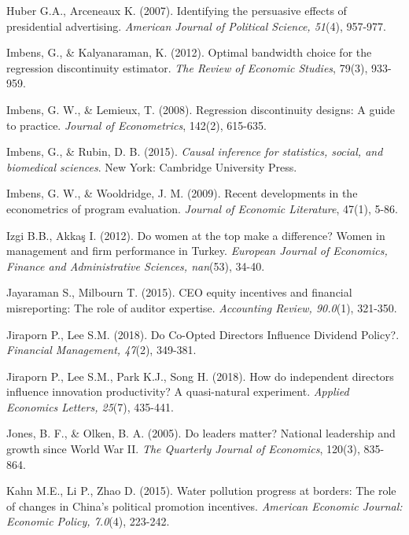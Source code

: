 \documentclass[english]{article}
\begin{document}
\begin{singlespace}
\begin{list}{}{\setlength\itemindent{-\leftmargin}}
\item *Huber G.A., Arceneaux K. (2007). Identifying the persuasive effects of presidential advertising. \emph{American Journal of Political Science, 51}(4), 957-977.

\item Imbens, G., \& Kalyanaraman, K. (2012). Optimal bandwidth choice for the regression discontinuity estimator. \emph{The Review of Economic Studies}, 79(3), 933-959.

\item Imbens, G. W., \& Lemieux, T. (2008). Regression discontinuity designs: A guide to practice. \emph{Journal of Econometrics}, 142(2), 615-635.

\item Imbens, G., \& Rubin, D. B. (2015). \emph{Causal inference for statistics, social, and biomedical sciences}. New York: Cambridge University Press.

\item Imbens, G. W., \& Wooldridge, J. M. (2009). Recent developments in the econometrics of program evaluation. \emph{Journal of Economic Literature}, 47(1), 5-86.

\item *Izgi B.B., Akkaş I. (2012). Do women at the top make a difference?  Women in management and firm performance in Turkey. \emph{European Journal of Economics, Finance and Administrative Sciences, nan}(53), 34-40.

\item *Jayaraman S., Milbourn T. (2015). CEO equity incentives and financial misreporting: The role of auditor expertise. \emph{Accounting Review, 90.0}(1), 321-350.

\item *Jiraporn P., Lee S.M. (2018). Do Co-Opted Directors Influence Dividend Policy?. \emph{Financial Management, 47}(2), 349-381.

\item *Jiraporn P., Lee S.M., Park K.J., Song H. (2018). How do independent directors influence innovation productivity? A quasi-natural experiment.  \emph{Applied Economics Letters, 25}(7), 435-441.

\item Jones, B. F., \& Olken, B. A. (2005). Do leaders matter? National leadership and growth since World War II. \emph{The Quarterly Journal of Economics}, 120(3), 835-864.

\item *Kahn M.E., Li P., Zhao D. (2015). Water pollution progress at borders: The role of changes in China's political promotion incentives.  \emph{American Economic Journal: Economic Policy, 7.0}(4), 223-242.


\end{list}
\end{singlespace}
\end{document}

